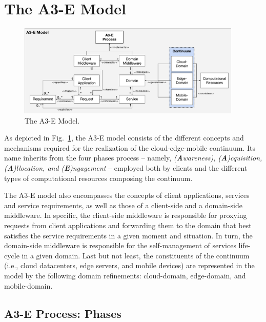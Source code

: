 \section{The A3-E Model}\label{sec:proposal}

\begin{figure}[tbp]
	\includegraphics[width=0.95\textwidth]{figs/A3-E-model.pdf}
	\caption{The A3-E Model.}
	\label{fig:A3-E-model}
\end{figure}

As depicted in Fig.~\ref{fig:A3-E-model}, the A3-E model consists of the different concepts and mechanisms required for the realization of the cloud-edge-mobile continuum. Its name inherits from the four phases process -- namely, \textit{(\textbf{A}wareness), (\textbf{A})cquisition, (\textbf{A})llocation, and (\textbf{E})ngagement} -- employed both by clients and the different types of computational resources composing the continuum. 

The A3-E model also encompasses the concepts of client applications, services and service requirements, as well as those of a client-side and a domain-side middleware. In specific, the client-side middleware is responsible for proxying requests from client applications and forwarding them to the domain that best satisfies the service requirements in a given moment and situation. In turn, the domain-side middleware is responsible for the self-management of services life-cycle in a given domain. Last but not least, the constituents of the continuum (i.e., cloud datacenters, edge servers, and mobile devices) are represented in the model by the following domain refinements: cloud-domain, edge-domain, and mobile-domain.

\subsection{A3-E Process: Phases}\label{sec:A3-E-process}

